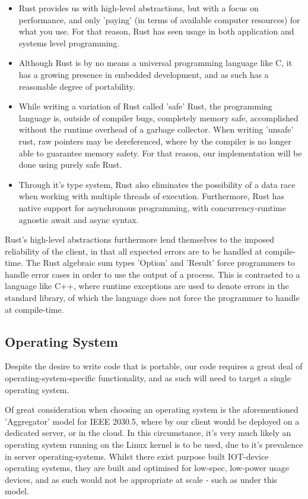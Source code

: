 \begin{itemize}
    \item Rust provides us with high-level abstractions, but with a focus on performance, and only 'paying' (in terms of available computer resources) for what you use. For that reason, Rust has seen usage in both application and systems level programming.
    \item Although Rust is by no means a universal programming language like C, it has a growing presence in embedded development, and as such has a reasonable degree of portability.
    \item While writing a variation of Rust called 'safe' Rust, the programming language is, outside of compiler bugs, completely memory safe, accomplished without the runtime overhead of a garbage collector. When writing 'unsafe' rust, raw pointers may be dereferenced, where by the compiler is no longer able to guarantee memory safety. For that reason, our implementation will be done using purely safe Rust.
    \item Through it's type system, Rust also eliminates the possibility of a data race when working with multiple threads of execution. Furthermore, Rust has native support for asynchronous programming, with concurrency-runtime agnostic await and async syntax.
\end{itemize}

Rust's high-level abstractions furthermore lend themselves to the imposed reliability of the client, in that all expected errors are to be handled at compile-time. The Rust algebraic sum types 'Option' and 'Result' force programmers to handle error cases in order to use the output of a process.
This is contrasted to a language like C++, where runtime exceptions are used to denote errors in the standard library, of which the language does not force the programmer to handle at compile-time.

\subsection{Operating System}
Despite the desire to write code that is portable, our code requires a great deal of operating-system-specific functionality, and as such will need to target a single operating system. 

Of great consideration when choosing an operating system is the aforementioned 'Aggregator' model for IEEE 2030.5, where by our client would be deployed on a dedicated server, or in the cloud. In this circumstance, it's very much likely an operating system running on the Linux kernel is to be used, due to it's prevalence in server operating-systems.
Whilst there exist purpose built IOT-device operating systems, they are built and optimised for low-spec, low-power usage devices, and as such would not be appropriate at scale - such as under this model.

